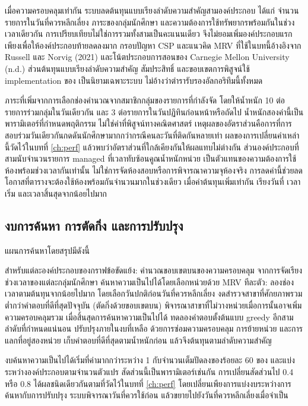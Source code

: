 \documentclass[12pt,a4paper]{article}
\newcommand{\codebreaks}{\do\.\do\_\do\:\do\/\do\-\do\;}
\newcommand{\code}[1]{\bgroup\def\UrlBreaks{\codebreaks}\path{#1}\egroup}
\begin{document}
เมื่อความครอบคลุมเท่ากัน ระบบลดต้นทุนแบบเรียงลำดับความสำคัญสามองค์ประกอบ ได้แก่ จำนวนรายการในวันที่ควรหลีกเลี่ยง ภาระของกลุ่มนักศึกษา และความต้องการใช้ทรัพยากรพร้อมกันในช่วงเวลาเดียวกัน การเปรียบเทียบไม่ใช่การรวมทั้งสามเป็นคะแนนเดียว จึงไม่ยอมเพิ่มองค์ประกอบแรกเพียงเพื่อให้องค์ประกอบท้ายลดลงมาก กรอบปัญหา CSP และแนวคิด MRV ที่ใช้ในบทนี้อ้างอิงจาก Russell และ Norvig (2021) และโน้ตประกอบการสอนของ Carnegie Mellon University (n.d.) ส่วนต้นทุนแบบเรียงลำดับความสำคัญ สัมประสิทธิ์ และขอบเขตการพิสูจน์ใช้ implementation ของ \code{solveUnits} เป็นนิยามเฉพาะระบบ ไม่อ้างว่าตำรารับรองอัลกอริทึมนี้ทั้งหมด

ภาระที่เพิ่มจากการเลือกช่องคำนวณจากสมาชิกกลุ่มของรายการที่กำลังจัด โดยให้น้ำหนัก 10 ต่อรายการร่วมกลุ่มในวันเดียวกัน และ 3 ต่อรายการในวันปฏิทินก่อนหน้าหรือถัดไป น้ำหนักสองค่านี้เป็นพารามิเตอร์ที่กำหนดพฤติกรรม ไม่ใช่ค่าที่พิสูจน์ทางคณิตศาสตร์ เหตุผลของอัตราส่วนคือการที่การสอบร่วมวันเดียวกันกดดันนักศึกษามากกว่ากรณีคนละวันที่ติดกันหลายเท่า ผลของการเปลี่ยนค่าเหล่านี้วัดไว้ในบทที่ \ref{ch:perf} แล้วพบว่าอัตราส่วนที่ใกล้เคียงกันให้ผลแทบไม่ต่างกัน ส่วนองค์ประกอบที่สามนับจำนวนรายการ managed ที่เวลาทับซ้อนคูณน้ำหนักหน่วย เป็นตัวแทนของความต้องการใช้ห้องพร้อมช่วงเวลากันเท่านั้น ไม่ใช่การจัดห้องสอบหรือการพิจารณาความจุห้องจริง การลดค่านี้ช่วยลดโอกาสที่ตารางจะต้องใช้ห้องพร้อมกันจำนวนมากในช่วงเดียว เมื่อค่าต้นทุนเพิ่มเท่ากัน เรียงวันที่ เวลาเริ่ม และเวลาสิ้นสุดจากน้อยไปมาก
\subsection{งบการค้นหา การตัดกิ่ง และการปรับปรุง}
แผนการค้นหาโดยสรุปมีดังนี้

สำหรับแต่ละองค์ประกอบของกราฟข้อขัดแย้ง: คำนวณขอบเขตบนของความครอบคลุม จากการจัดเรียงช่วงเวลาของแต่ละกลุ่มนักศึกษา ค้นหาความเป็นไปได้โดยเลือกหน่วยด้วย MRV ทีละตัว: ลองช่องเวลาตามต้นทุนจากน้อยไปมาก โดยเลือกวันปกติก่อนวันที่ควรหลีกเลี่ยง งดสำรวจสาขาที่ศักยภาพรวมต่ำกว่าคำตอบที่ดีที่สุดปัจจุบัน (ตัดกิ่งด้วยขอบเขตบน) พิจารณาสาขาที่ไม่วางหน่วยเมื่อการนั้นอาจเพิ่มความครอบคลุมรวม เมื่อสิ้นสุดการค้นหาความเป็นไปได้ ทดลองคำตอบตั้งต้นแบบ greedy อีกสามลำดับที่กำหนดแน่นอน ปรับปรุงภายในงบที่เหลือ ด้วยการซ่อมความครอบคลุม การย้ายหน่วย และการแลกที่อยู่สองหน่วย เก็บคำตอบที่ดีที่สุดตามน้ำหนักก่อน แล้วจึงต้นทุนตามลำดับความสำคัญ

งบค้นหาความเป็นไปได้เริ่มที่ค่ามากกว่าระหว่าง 1 กับจำนวนเต็มปัดลงของร้อยละ 60 ของ \code{searchBudget} และแบ่งระหว่างองค์ประกอบตามจำนวนตัวแปร สัดส่วนนี้เป็นพารามิเตอร์เช่นกัน การเปลี่ยนสัดส่วนไป 0.4 หรือ 0.8 ได้ผลชนิดเดียวกันตามที่วัดไว้ในบทที่ \ref{ch:perf} โดยเปลี่ยนเพียงการแบ่งงบระหว่างการค้นหากับการปรับปรุง ระบบพิจารณาวันที่ควรใช้ก่อน แล้วขยายไปยังวันที่ควรหลีกเลี่ยงเมื่อจำเป็น
\end{document}
